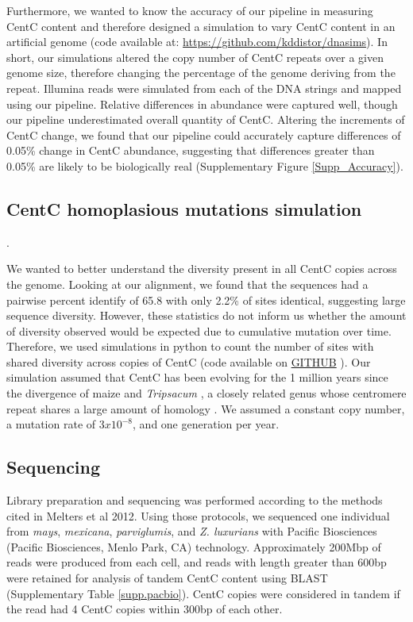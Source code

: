 Furthermore, we wanted to know the accuracy of our pipeline in measuring CentC content and therefore designed a simulation to vary CentC content in an artificial genome (code available at: \url{https://github.com/kddistor/dnasims}).  In short, our simulations altered the copy number of CentC repeats over a given genome size, therefore changing the percentage of the genome deriving from the repeat.  Illumina reads were simulated from each of the DNA strings and mapped using our pipeline.  Relative differences in abundance were captured well, though our pipeline underestimated overall quantity of CentC.  Altering the increments of CentC change, we found that our pipeline could accurately capture differences of 0.05\% change in CentC abundance, suggesting that differences greater than 0.05\% are likely to be biologically real (Supplementary Figure \ref{Supp_Accuracy}).  

\subsection*{CentC homoplasious mutations simulation}

. 

We wanted to better understand the diversity present in all CentC copies across the genome.  Looking at our alignment, we found that the sequences had a pairwise percent identify of 65.8 with only 2.2\% of sites identical, suggesting large sequence diversity.  However, these statistics do not inform us whether the amount of diversity observed would be expected due to cumulative mutation over time.  Therefore, we used simulations in python to count the number of sites with shared diversity across copies of CentC (code available on \url{GITHUB} ).  Our simulation assumed that CentC has been evolving for the 1 million years since the divergence of maize and \emph{Tripsacum} \citep{Ross-Ibarra2009}, a closely related genus whose centromere repeat shares a large amount of homology \citep{Melters2012}.  We assumed a constant copy number, a mutation rate of $3 x 10^{-8}$, and one generation per year.  

\subsection*{Sequencing}
	
Library preparation and sequencing was performed according to the methods cited in Melters et al 2012.  Using those protocols, we sequenced one individual from \emph{mays}, \emph{mexicana}, \emph{parviglumis}, and \emph{Z. luxurians} with Pacific Biosciences (Pacific Biosciences, Menlo Park, CA) technology. Approximately 200Mbp of reads were produced from each cell, and reads with length greater than 600bp were retained for analysis of tandem CentC content using BLAST (Supplementary Table \ref{supp.pacbio}).  CentC copies were considered in tandem if the read had 4 CentC copies within 300bp of each other. 

